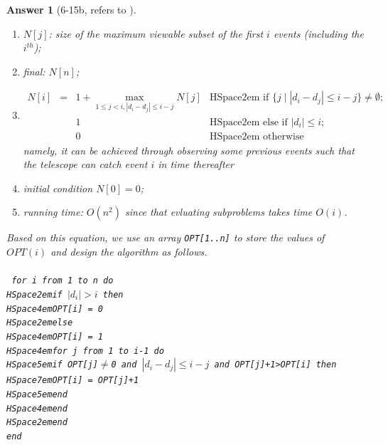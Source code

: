 \documentclass[11pt]{article}
\theoremstyle{numberplain}
\theoremstyle{nonumberplain}
\newtheorem{ans}{Answer}
\newcommand{\0}{{\mathbf{0}}}
\begin{document}
\begin{ans}[6-15b, refers to \cite{fulinyun}]
\begin{enumerate}
\item $N[j]$: size of the maximum viewable subset of the first $i$ events (including the $i^{th}$);
\item final: $N[n]$;
\item \begin{align*}
\nonumber N[i] & = &1+ \max_{1\le j < i, |d_i-d_j|\le i-j}{N[j]} & \textrm{HSpace{2em} if }\{j\mid |d_i-d_j|\le i-j\}\ne \emptyset;\\\nonumber
 & & 1 & \textrm{HSpace{2em} else if }|d_i|\le i;\\
 & & 0 & \textrm{HSpace{2em} otherwise}
\end{align*}
namely, it can be achieved through observing some previous events such that the telescope can catch event $i$ in time thereafter
\item initial condition $N[0]=0$;
\item running time: $O(n^2)$ since that evluating subproblems takes time $O(i)$.
\end{enumerate}
Based on this equation, we use an array \texttt{OPT[1..n]} to store the values of $OPT(i)$ and design the algorithm as follows.
\\
\\\tt
for i from 1 to n do\\
\mbox{HSpace{2em}}if $|d_i| > i$ then\\
\mbox{HSpace{4em}}OPT[i] = 0\\
\mbox{HSpace{2em}}else\\
\mbox{HSpace{4em}}OPT[i] = 1\\
\mbox{HSpace{4em}}for j from 1 to i-1 do\\
\mbox{HSpace{5em}}if OPT[j]$\ne$0 and $|d_i-d_j|\le i-j$ and OPT[j]+1>OPT[i] then\\
\mbox{HSpace{7em}}OPT[i] = OPT[j]+1\\
\mbox{HSpace{5em}}end\\
\mbox{HSpace{4em}}end\\
\mbox{HSpace{2em}}end\\
end\\
\rm
\end{ans}
\end{document}
